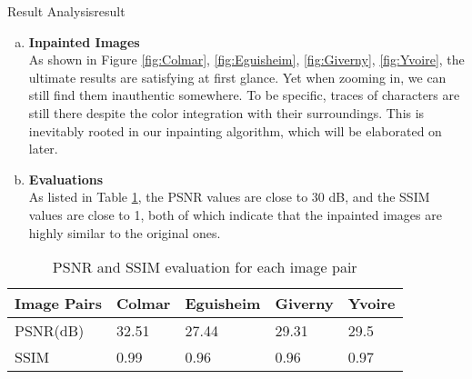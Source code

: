 \begin{problem}{Result Analysis}{result}

\begin{enumerate}[(a)]
    \item \textbf{Inpainted Images}\\ As shown in Figure \ref{fig:Colmar}, \ref{fig:Eguisheim}, \ref{fig:Giverny}, \ref{fig:Yvoire}, the ultimate results are satisfying at first glance. Yet when zooming in, we can still find them inauthentic somewhere. To be specific, traces of characters are still there despite the color integration with their surroundings. This is inevitably rooted in our inpainting algorithm, which will be elaborated on later.

    \item \textbf{Evaluations}\\As listed in Table \ref{table:evaluation}, the PSNR values are close to 30 dB, and the SSIM values are close to 1, both of which indicate that the inpainted images are highly similar to the original ones.
\end{enumerate}
\end{problem}

\begin{table}[]
    \centering
    \begin{tabular}{|l|l|l|l|l|}
        \hline
        Image Pairs & Colmar & Eguisheim & Giverny & Yvoire \\ \hline
        PSNR(dB)        & 32.51  & 27.44     & 29.31   & 29.5   \\ \hline
        SSIM        & 0.99   & 0.96      & 0.96    & 0.97   \\ \hline
    \end{tabular}
    \caption{PSNR and SSIM evaluation for each image pair}
    \label{table:evaluation}
\end{table}

